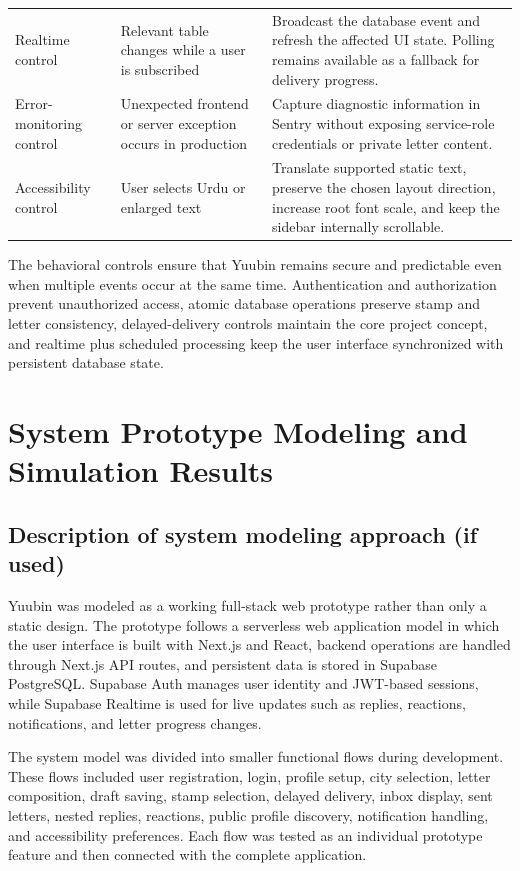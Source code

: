 ﻿\documentclass[12pt,a4paper]{report}
\begin{document}
\begin{longtable}{p{3.5cm} p{4.5cm} p{5.7cm}}
Realtime control & Relevant table changes while a user is subscribed & Broadcast the database event and refresh the affected UI state. Polling remains available as a fallback for delivery progress. \\
Error-monitoring control & Unexpected frontend or server exception occurs in production & Capture diagnostic information in Sentry without exposing service-role credentials or private letter content. \\
Accessibility control & User selects Urdu or enlarged text & Translate supported static text, preserve the chosen layout direction, increase root font scale, and keep the sidebar internally scrollable. \\
\bottomrule
\end{longtable}

The behavioral controls ensure that Yuubin remains secure and predictable even when multiple events occur at the same time. Authentication and authorization prevent unauthorized access, atomic database operations preserve stamp and letter consistency, delayed-delivery controls maintain the core project concept, and realtime plus scheduled processing keep the user interface synchronized with persistent database state.

\newpage

\chapter{System Prototype Modeling and Simulation Results}

\section{Description of system modeling approach (if used)}

Yuubin was modeled as a working full-stack web prototype rather than only a static design. The prototype follows a serverless web application model in which the user interface is built with Next.js and React, backend operations are handled through Next.js API routes, and persistent data is stored in Supabase PostgreSQL. Supabase Auth manages user identity and JWT-based sessions, while Supabase Realtime is used for live updates such as replies, reactions, notifications, and letter progress changes.

The system model was divided into smaller functional flows during development. These flows included user registration, login, profile setup, city selection, letter composition, draft saving, stamp selection, delayed delivery, inbox display, sent letters, nested replies, reactions, public profile discovery, notification handling, and accessibility preferences. Each flow was tested as an individual prototype feature and then connected with the complete application.
\end{document}
